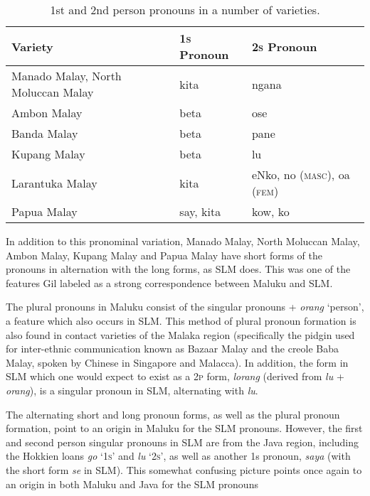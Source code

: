 \begin{table}

\begin{tabular}{lll}
\textbf{Variety} &
\textbf{1}\textbf{\textsc{s}}\textbf{ Pronoun} &
\textbf{2}\textbf{\textsc{s}}\textbf{ Pronoun}\footnotemark{}\\\hline
Manado Malay, North Moluccan Malay &
kita &
ngana\\
Ambon Malay &
beta &
ose\\
Banda Malay &
beta &
pane\\
Kupang Malay &
beta &
lu\\
Larantuka Malay &
kita &
eNko, no (\textsc{masc}), oa (\textsc{fem})\\
Papua Malay &
say, kita &
kow, ko\\
\end{tabular}
\caption{1st and 2nd person pronouns in a number of varieties.}
\label{paauw:tab:pronouns}
\end{table}

In addition to this pronominal variation, Manado Malay, North Moluccan Malay, Ambon Malay, Kupang Malay and Papua Malay have short forms of the pronouns in alternation with the long forms, as SLM does. This was one of the features Gil labeled as a strong correspondence between Maluku and SLM.

The plural pronouns in Maluku consist of the singular pronouns + \textit{orang} `person', a feature which also occurs in SLM. This method of plural pronoun formation is also found in contact varieties of the Malaka region (specifically the pidgin used for inter-ethnic communication known as Bazaar Malay and the creole Baba Malay, spoken by Chinese in Singapore and Malacca). In addition, the form in SLM which one would expect to exist as a 2\textsc{p }form, \textit{lorang} (derived from \textit{lu} + \textit{orang}), is a singular pronoun in SLM, alternating with \textit{lu}.

The alternating short and long pronoun forms, as well as the plural pronoun formation, point to an origin in Maluku for the SLM pronouns. However, the first and second person singular pronouns in SLM are from the Java region, including the Hokkien loans \textit{go} `1\textsc{s}' and \textit{lu} `2\textsc{s}', as well as another 1s pronoun, \textit{saya} (with the short form \textit{se} in SLM). This somewhat confusing picture points once again to an origin in both Maluku and Java for the SLM pronouns

